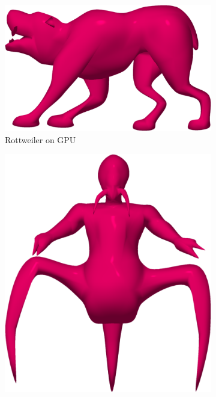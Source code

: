 \begin{figure}
	\begin{subfigure}[b]{0.2\textwidth}
		\centering
		\includegraphics[width=\textwidth]{content/img/results/cpugpu/doggpu.png}
		\caption{Rottweiler on GPU}
		\label{fig:results:cpugpu:gpuDog}
	\end{subfigure}
	\hspace{0.1\textwidth}
	\begin{subfigure}[b]{0.2\textwidth}
		\centering
		\includegraphics[width=\textwidth]{content/img/results/cpugpu/voregpu.png}

\end{subfigure}
\end{figure}
